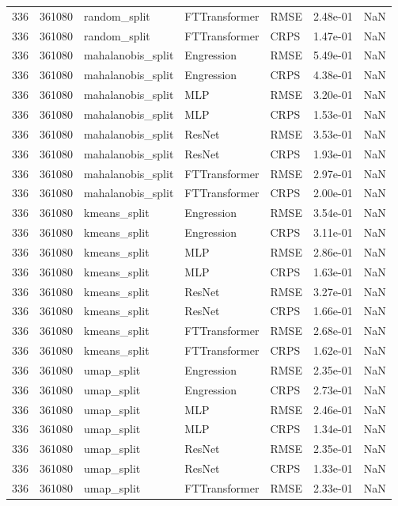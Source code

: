 \begin{tabular}{rrlllrr}
336 & 361080 & random\_split & FTTransformer & RMSE & 2.48e-01 & NaN \\
336 & 361080 & random\_split & FTTransformer & CRPS & 1.47e-01 & NaN \\
336 & 361080 & mahalanobis\_split & Engression & RMSE & 5.49e-01 & NaN \\
336 & 361080 & mahalanobis\_split & Engression & CRPS & 4.38e-01 & NaN \\
336 & 361080 & mahalanobis\_split & MLP & RMSE & 3.20e-01 & NaN \\
336 & 361080 & mahalanobis\_split & MLP & CRPS & 1.53e-01 & NaN \\
336 & 361080 & mahalanobis\_split & ResNet & RMSE & 3.53e-01 & NaN \\
336 & 361080 & mahalanobis\_split & ResNet & CRPS & 1.93e-01 & NaN \\
336 & 361080 & mahalanobis\_split & FTTransformer & RMSE & 2.97e-01 & NaN \\
336 & 361080 & mahalanobis\_split & FTTransformer & CRPS & 2.00e-01 & NaN \\
336 & 361080 & kmeans\_split & Engression & RMSE & 3.54e-01 & NaN \\
336 & 361080 & kmeans\_split & Engression & CRPS & 3.11e-01 & NaN \\
336 & 361080 & kmeans\_split & MLP & RMSE & 2.86e-01 & NaN \\
336 & 361080 & kmeans\_split & MLP & CRPS & 1.63e-01 & NaN \\
336 & 361080 & kmeans\_split & ResNet & RMSE & 3.27e-01 & NaN \\
336 & 361080 & kmeans\_split & ResNet & CRPS & 1.66e-01 & NaN \\
336 & 361080 & kmeans\_split & FTTransformer & RMSE & 2.68e-01 & NaN \\
336 & 361080 & kmeans\_split & FTTransformer & CRPS & 1.62e-01 & NaN \\
336 & 361080 & umap\_split & Engression & RMSE & 2.35e-01 & NaN \\
336 & 361080 & umap\_split & Engression & CRPS & 2.73e-01 & NaN \\
336 & 361080 & umap\_split & MLP & RMSE & 2.46e-01 & NaN \\
336 & 361080 & umap\_split & MLP & CRPS & 1.34e-01 & NaN \\
336 & 361080 & umap\_split & ResNet & RMSE & 2.35e-01 & NaN \\
336 & 361080 & umap\_split & ResNet & CRPS & 1.33e-01 & NaN \\
336 & 361080 & umap\_split & FTTransformer & RMSE & 2.33e-01 & NaN \\

\end{tabular}
